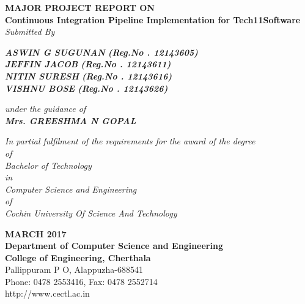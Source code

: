 \documentclass[12pt,a4paper,oneside]{report}
\begin{document}
\begin{titlepage}
\begin{center}

\large{\textbf{MAJOR PROJECT REPORT ON}}\\
\Large{\textbf{Continuous Integration Pipeline Implementation for Tech11Software}}\\

\large{\textit{Submitted By }}\\
\begin{singlespace}
\Large{\textit{\textbf{ASWIN G SUGUNAN }\textbf{(Reg.No . 12143605)}}} \\
\Large{\textit{\textbf{JEFFIN JACOB  }\textbf{(Reg.No . 12143611)}}} \\
\Large{\textit{\textbf{NITIN SURESH }\textbf{(Reg.No . 12143616)}}} \\
\Large{\textit{\textbf{VISHNU BOSE }\textbf{(Reg.No . 12143626)}}} \\

\end{singlespace}
\large{\textit{\textit{under the guidance of}}}\\
\Large{\textit{\textbf{Mrs. GREESHMA N GOPAL}}}\\
\begin{singlespace}
\large{\textit{In partial fulfilment of the requirements for the award of the degree}\\
\large{ \textit{of}}\\
\large{\textit{Bachelor of Technology} }\\
\large{\textit{in}}\\
\large{\textit{Computer Science and Engineering}}\\
\large{\textit{of}}\\
\large{\textit{Cochin University Of Science And Technology}}}\\
\end{singlespace}
\begin{singlespace}
\begin{figure}[h]
\begin{center}
\end{center}
\end{figure}
\end{singlespace}
\begin{singlespace}
\large{{\textbf{MARCH 2017\\Department of Computer Science and Engineering\\College of Engineering, Cherthala}\\
Pallippuram P O, Alappuzha-688541 \\Phone: 0478 2553416, Fax: 0478 2552714\\http://www.cectl.ac.in}}
\end{singlespace}
\end{center}
\end{titlepage}
\end{document}
